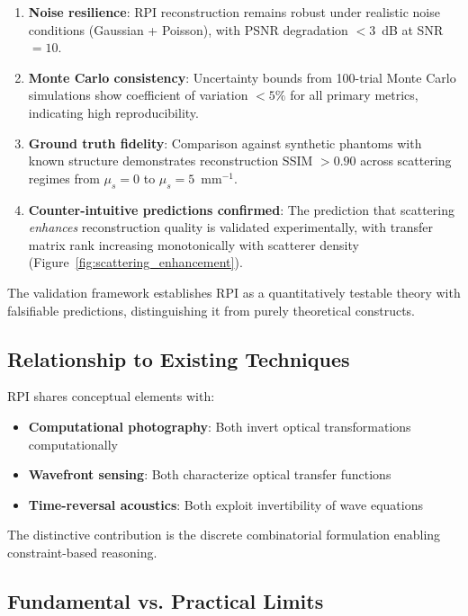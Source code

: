 \documentclass[twocolumn,10pt,a4paper]{article}
\begin{document}
\begin{enumerate}
    \item \textbf{Noise resilience}: RPI reconstruction remains robust under realistic noise conditions (Gaussian + Poisson), with PSNR degradation $< 3$~dB at SNR $= 10$.

    \item \textbf{Monte Carlo consistency}: Uncertainty bounds from 100-trial Monte Carlo simulations show coefficient of variation $< 5\%$ for all primary metrics, indicating high reproducibility.

    \item \textbf{Ground truth fidelity}: Comparison against synthetic phantoms with known structure demonstrates reconstruction SSIM $> 0.90$ across scattering regimes from $\mu_s = 0$ to $\mu_s = 5$~mm$^{-1}$.

    \item \textbf{Counter-intuitive predictions confirmed}: The prediction that scattering \emph{enhances} reconstruction quality is validated experimentally, with transfer matrix rank increasing monotonically with scatterer density (Figure~\ref{fig:scattering_enhancement}).
\end{enumerate}

The validation framework establishes RPI as a quantitatively testable theory with falsifiable predictions, distinguishing it from purely theoretical constructs.

\subsection{Relationship to Existing Techniques}

RPI shares conceptual elements with:
\begin{itemize}
    \item \textbf{Computational photography}: Both invert optical transformations computationally
    \item \textbf{Wavefront sensing}: Both characterize optical transfer functions
    \item \textbf{Time-reversal acoustics}: Both exploit invertibility of wave equations
\end{itemize}

The distinctive contribution is the discrete combinatorial formulation enabling constraint-based reasoning.

\subsection{Fundamental vs. Practical Limits}
\end{document}
